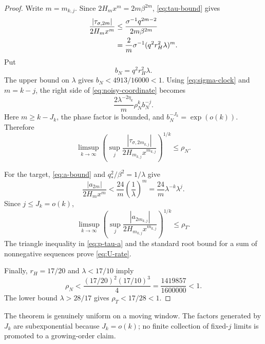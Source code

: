 \documentclass[11pt]{article}
\theoremstyle{remark}
\begin{document}
\begin{proof}
Write $m=m_{k,j}$.  Since
$2H_mx^m=2m\beta^{2m}$, \eqref{eq:tau-bound} gives
\begin{align}
 \frac{|\tau_{\sigma,2m}|}{2H_mx^m}
 &\le \frac{\sigma^{-1}q^{2m-2}}{2m\beta^{2m}}\notag\\
 &=\frac{2}{m}\sigma^{-1}
       (q^2r_H^2\lambda)^m.\label{eq:noisy-coordinate}
\end{align}
Put
\begin{equation}\label{eq:bN}
 b_N=q^2r_H^2\lambda.
\end{equation}
The upper bound on $\lambda$ gives
$b_N<4913/16000<1$.  Using
\eqref{eq:sigma-clock} and $m=k-j$, the right side of
\eqref{eq:noisy-coordinate} becomes
\begin{equation}\label{eq:noisy-factorization}
 \frac{2\lambda^{-2\eta_k}}{m}
 \rho_N^k b_N^{-j}.
\end{equation}
Here $m\ge k-J_k$, the phase factor is bounded, and
$b_N^{-J_k}=\exp(o(k))$.  Therefore
\begin{equation}\label{eq:noisy-root}
 \limsup_{k\to\infty}
 \left(
 \sup_j\frac{|\tau_{\sigma,2m_{k,j}}|}
 {2H_{m_{k,j}}x^{m_{k,j}}}
 \right)^{1/k}
 \le\rho_N.
\end{equation}

For the target, \eqref{eq:a-bound} and
$q_*^2/\beta^2=1/\lambda$ give
\begin{equation}\label{eq:target-coordinate}
 \frac{|a_{2m}|}{2H_mx^m}
 <\frac{24}{m}\left(\frac1\lambda\right)^m
 =\frac{24}{m}\lambda^{-k}\lambda^j.
\end{equation}
Since $j\le J_k=o(k)$,
\begin{equation}\label{eq:target-root}
 \limsup_{k\to\infty}
 \left(
 \sup_j\frac{|a_{2m_{k,j}}|}
 {2H_{m_{k,j}}x^{m_{k,j}}}
 \right)^{1/k}
 \le\rho_T.
\end{equation}
The triangle inequality in \eqref{eq:p-tau-a} and the standard root bound
for a sum of nonnegative sequences prove \eqref{eq:U-rate}.

Finally, $r_H=17/20$ and $\lambda<17/10$ imply
\[
 \rho_N<\frac{(17/20)^2(17/10)^3}{4}
 =\frac{1419857}{1600000}<1.
\]
The lower bound $\lambda>28/17$ gives
$\rho_T<17/28<1$.
\end{proof}

The theorem is genuinely uniform on a moving window.  The factors generated
by $J_k$ are subexponential because $J_k=o(k)$; no finite collection of
fixed-$j$ limits is promoted to a growing-order claim.
\end{document}
